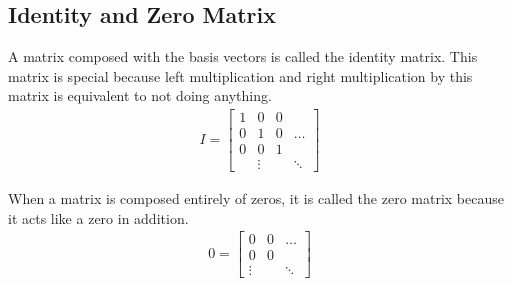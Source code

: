 \documentclass{article}
\theoremstyle{mytheoremstyle}
\theoremstyle{mytheoremstyle}
\theoremstyle{myproblemstyle}
\begin{document}
    \subsection*{Identity and Zero Matrix}
    A matrix composed with the basis vectors is called the identity matrix. This
    matrix is special because left multiplication and right multiplication by
    this matrix is equivalent to not doing anything.
    \begin{align*}
        I = \begin{bmatrix}
            1 & 0 & 0 & \\
            0 & 1 & 0 & \dots \\
            0 & 0 & 1 & \\
             & \vdots &  & \ddots
        \end{bmatrix}
    \end{align*}

    When a matrix is composed entirely of zeros, it is called the zero matrix
    because it acts like a zero in addition.
    \begin{align*}
        0 = \begin{bmatrix}
            0 & 0 & \dots \\
            0 & 0 & \\
            \vdots & & \ddots
        \end{bmatrix}
    \end{align*}
\end{document}
